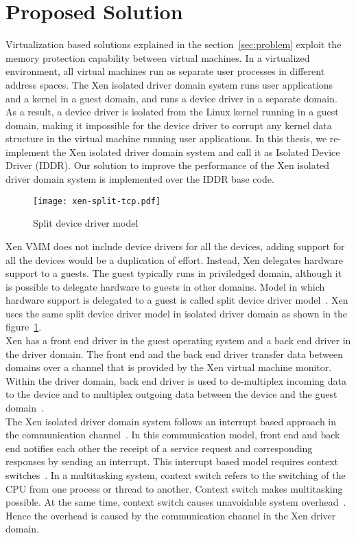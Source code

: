 \section {Proposed Solution} 
Virtualization based solutions explained in the section~\ref{sec:problem} exploit the memory protection capability between virtual machines. In a virtualized environment, all virtual machines run as separate user processes in different address spaces. The Xen isolated driver domain system runs user applications and a kernel in a guest domain, and runs a device driver in a separate domain. As a result, a device driver is isolated from the Linux kernel running in a guest domain, making it impossible for the device driver to corrupt any kernel data structure in the virtual machine running user applications. In this thesis, we re-implement the Xen isolated driver domain system and call it as Isolated Device Driver (IDDR). Our solution to improve the performance of the Xen isolated driver domain system is implemented over the IDDR base code.
\\[3mm]
\begin{figure}[!ht]
\centering
\texttt{[image: xen-split-tcp.pdf]}
\caption{Split device driver model}
\label{fig:xen-split}
\end{figure}
Xen VMM does not include device drivers for all the devices, adding support for all the devices would be a duplication of effort. Instead, Xen delegates hardware support to a guests. The guest typically runs in priviledged domain, although it is possible to delegate hardware to guests in other domains. Model in which hardware support is delegated to a guest is called split device driver model~\cite{Chisnall:2007:DGX:1407351}. Xen uses the same split device driver model in isolated driver domain as shown in the figure~\ref{fig:xen-split}.
\\[3mm]
Xen has a front end driver in the guest operating system and a back end driver in the driver domain. The front end and the back end driver transfer data between domains over a channel that is provided by the Xen virtual machine monitor. Within the driver domain, back end driver is used to de-multiplex incoming data to the device and to multiplex outgoing data between the device and the guest domain~\cite{driverdomain}.
\\[3mm]
The Xen isolated driver domain system follows an interrupt based approach in the communication channel~\cite{Barham:2003:XAV:945445.945462}. In this communication model, front end and back end notifies each other the receipt of a service request and corresponding responses by sending an interrupt. This interrupt based model requires context switches~\cite{Barham:2003:XAV:945445.945462}. In a multitasking system, context switch refers to the switching of the CPU from one process or thread to another. Context switch makes multitasking possible. At the same time, context switch causes unavoidable system overhead~\cite{Li:2007:QCC:1281700.1281702, Mogul:1991:ECS:106973.106982}. Hence the overhead is caused by the communication channel in the Xen driver domain. 
